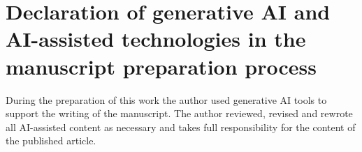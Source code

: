 \documentclass[review,12pt,authoryear]{elsarticle}
\theoremstyle{plain}
\theoremstyle{definition}
\begin{document}
\section*{Declaration of generative AI and AI-assisted technologies in the
manuscript preparation process}

During the preparation of this work the author used generative AI tools to
support the writing of the manuscript. The author reviewed, revised and
rewrote all AI-assisted content as necessary and takes full responsibility for
the content of the published article.



\end{document}
